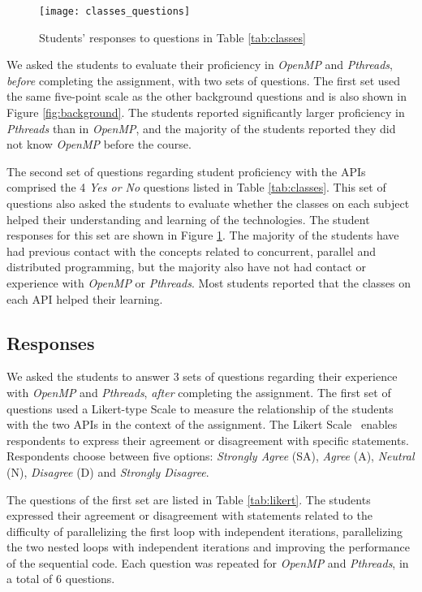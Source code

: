 \begin{figure}[htpb]
    \vspace{-0.7em}
    \centering
    \texttt{[image: classes\_questions]}
    \caption{Students' responses to questions in Table \ref{tab:classes}}
    \label{fig:classes}
    \vspace{-1em}
\end{figure}

We asked the students to evaluate their proficiency in \textit{OpenMP} and
\textit{Pthreads}, \textit{before} completing the assignment, with two sets of
questions. The first set used the same five-point scale as the other background
questions and is also shown in Figure \ref{fig:background}. The students
reported significantly larger proficiency in \textit{Pthreads} than in
\textit{OpenMP}, and the majority of the students reported they did not know
\textit{OpenMP} before the course.

The second set of questions regarding student proficiency with the APIs
comprised the 4 \textit{Yes or No} questions listed in Table \ref{tab:classes}.
This set of questions also asked the students to evaluate whether the classes
on each subject helped their understanding and learning of the technologies.
The student responses for this set are shown in Figure \ref{fig:classes}.  The
majority of the students have had previous contact with the concepts related to
concurrent, parallel and distributed programming, but the majority also have
not had contact or experience with \textit{OpenMP} or \textit{Pthreads}.  Most
students reported that the classes on each API helped their learning.

\subsection{Responses}

We asked the students to answer 3 sets of questions regarding their
experience with \textit{OpenMP} and \textit{Pthreads}, \textit{after}
completing the assignment.
The first set of questions used a Likert-type Scale to measure the relationship
of the students with the two APIs in the context of the assignment. The Likert
Scale~\cite{likert1932technique} enables respondents to express their agreement
or disagreement with specific statements. Respondents choose between five
options: \textit{Strongly Agree} (SA), \textit{Agree} (A), \textit{Neutral}
(N), \textit{Disagree} (D) and \textit{Strongly Disagree}.

The questions of the first set are listed in Table \ref{tab:likert}. The
students expressed their agreement or disagreement with statements related to
the difficulty of parallelizing the first loop with independent iterations,
parallelizing the two nested loops with independent iterations and improving
the performance of the sequential code. Each question was repeated for
\textit{OpenMP} and \textit{Pthreads}, in a total of $6$ questions.

